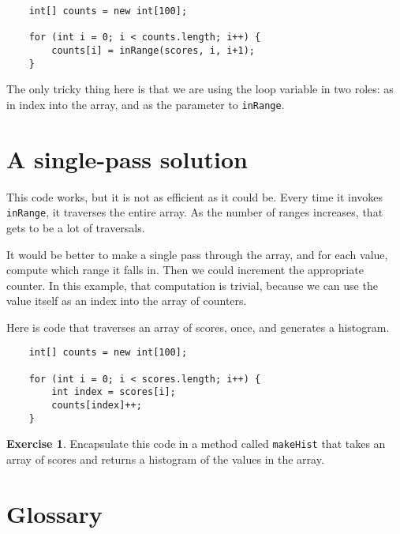 \documentclass[12pt]{book}
\theoremstyle{definition}
\newtheorem{excz}{Exercise}[chapter]
\newenvironment{exercise}{\bigskip\begin{excz}\mbox{}}{\end{excz}}
\begin{document}
\begin{lstlisting}
    int[] counts = new int[100];

    for (int i = 0; i < counts.length; i++) {
        counts[i] = inRange(scores, i, i+1);
    }
\end{lstlisting}
%
The only tricky thing here is that we are using the loop variable
in two roles: as in index into the array, and as the parameter to
{\tt inRange}.


\section{A single-pass solution}

This code works, but it is not as efficient as it could
be.  Every time it invokes {\tt inRange}, it traverses the
entire array.  As the number of ranges increases, that gets
to be a lot of traversals.

It would be better to make a single pass through the array,
and for each value, compute which range it falls in.  Then
we could increment the appropriate counter.
In this example, that computation is trivial, because we
can use the value itself as an index into the array of counters.

Here is code that traverses an array of scores, once, and generates
a histogram.

\begin{lstlisting}
    int[] counts = new int[100];

    for (int i = 0; i < scores.length; i++) {
        int index = scores[i];
        counts[index]++;
    }
\end{lstlisting}

\begin{exercise}
Encapsulate this code in a method called {\tt makeHist} that
takes an array of scores and returns a histogram of the values
in the array.
\end{exercise}


\section{Glossary}
\end{document}
